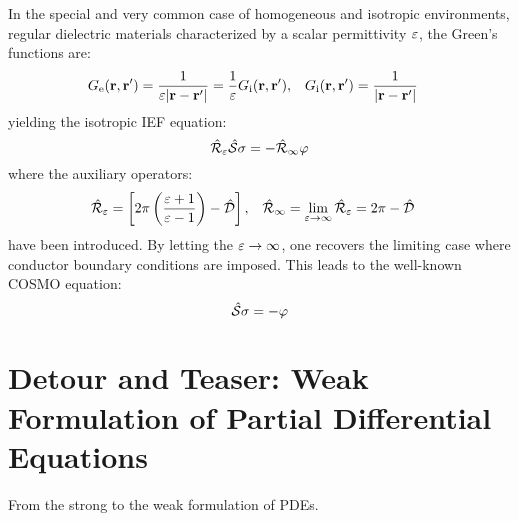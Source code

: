 In the special and very common case of homogeneous and isotropic
environments, \ie regular dielectric materials characterized by a scalar
permittivity $\varepsilon$, the Green's functions are:
\begin{alignat}{2}
  G_\mathrm{e}(\mathbf{r}, \mathbf{r}^\prime) = \frac{1}{\varepsilon|\mathbf{r}-\mathbf{r}^\prime|} = \frac{1}{\varepsilon} G_\mathrm{i}(\mathbf{r}, \mathbf{r}^\prime),
  \quad&
  G_\mathrm{i}(\mathbf{r}, \mathbf{r}^\prime) = \frac{1}{|\mathbf{r}-\mathbf{r}^\prime|}
\end{alignat}
yielding the isotropic \acs{IEF} equation:
\begin{equation}\label{eq:isotropic-IEF}
  \hat{\mathcal{R}}_\varepsilon\hat{\mathcal{S}}\sigma = - \hat{\mathcal{R}}_\infty\varphi
\end{equation}
where the auxiliary operators:
\begin{alignat}{2}
  \hat{\mathcal{R}}_\varepsilon = \left[
  2\pi \left(\frac{\varepsilon+1}{\varepsilon-1}\right) - \hat{\mathcal{D}}
  \right],
  \quad&
  \hat{\mathcal{R}}_\infty =  \lim_{\varepsilon\rightarrow\infty}\hat{\mathcal{R}}_\varepsilon
  = 2\pi-\hat{\mathcal{D}}
\end{alignat}
have been introduced.
By letting the $\varepsilon\rightarrow\infty$, one recovers the limiting case
where conductor boundary conditions are imposed. This leads to the
well-known \ac{COSMO} equation:~\autocite{Klamt1993-mj, Cossi2003-xe}
\begin{equation}
  \hat{\mathcal{S}}\sigma = - \varphi
\end{equation}

\section{Detour and Teaser: Weak Formulation of Partial Differential Equations}\label{sec:weak}

From the strong to the weak formulation of \acp{PDE}.\autocite{Ern2004-oo}

